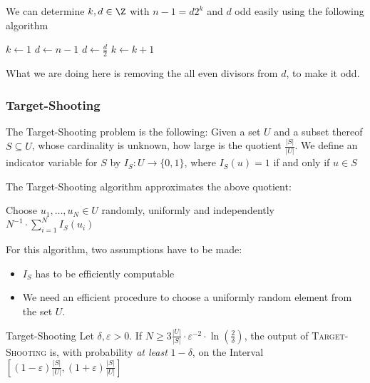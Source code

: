 \newpage

 We can determine $k, d \in \Z$ with $n - 1 = d2^k$ and $d$ odd easily using the following algorithm
\begin{algorithm}
    \caption{Get $d$ and $k$ easily}\label{alg:get-d-k}
    \begin{algorithmic}[1]
        \State $k \gets 1$
        \State $d \gets n - 1$
            \State $d \gets \frac{d}{2}$
            \State $k \gets k + 1$
        \EndWhile
    \end{algorithmic}
\end{algorithm}

What we are doing here is removing the all even divisors from $d$, to make it odd.


\subsubsection{Target-Shooting}
The Target-Shooting problem is the following: Given a set $U$ and a subset thereof $S \subseteq U$, whose cardinality is unknown, how large is the quotient $\frac{|S|}{|U|}$. We define an indicator variable for $S$ by $I_S : U \rightarrow \{0, 1\}$, where $I_S(u) = 1$ if and only if $u \in S$

The Target-Shooting algorithm approximates the above quotient:
\begin{algorithm}
    \caption{Target-Shooting}\label{alg:target-shooting}
    \begin{algorithmic}[1]
            \State Choose $u_1, \ldots, u_N \in U$ randomly, uniformly and independently
            \State \Return $N^{-1} \cdot \sum_{i = 1}^{N} I_S(u_i)$
        \EndProcedure
    \end{algorithmic}
\end{algorithm}

For this algorithm, two assumptions have to be made:
\begin{itemize}
    \item $I_S$ has to be efficiently computable
    \item We need an efficient procedure to choose a uniformly random element from the set $U$.
\end{itemize}

\begin{theorem}[]{Target-Shooting}
    Let $\delta, \varepsilon > 0$. If $N \geq 3 \frac{|U|}{|S|} \cdot \varepsilon^{-2} \cdot \ln\left(\frac{2}{\delta}\right)$, the output of \textsc{Target-Shooting} is, with probability \textit{at least} $1 - \delta$, on the Interval $\left[ (1 - \varepsilon) \frac{|S|}{|U|}, (1 + \varepsilon) \frac{|S|}{|U|} \right]$
\end{theorem}



